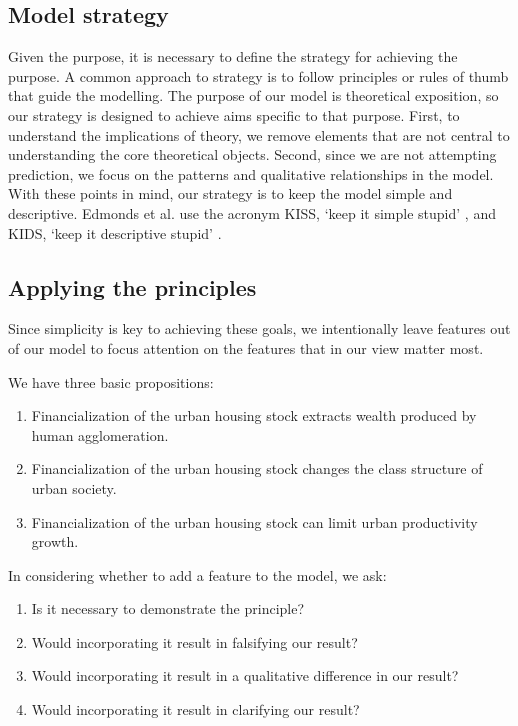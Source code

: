 \subsection{Model strategy}
Given the purpose, it is necessary to define the strategy for achieving the purpose. 
A common approach to strategy is to follow principles or rules of thumb that guide the modelling. %
The purpose of our model is theoretical exposition, so our strategy is designed to achieve aims specific to that purpose. First, to understand the implications of theory, we remove elements that are not central to understanding the core theoretical objects. Second, since we are not attempting prediction, we focus on the patterns and qualitative relationships in the model. With these points in mind, our strategy is to keep the model simple and descriptive. Edmonds et al. use the acronym KISS, `keep it simple stupid' \cite{edmondsDifferentModellingPurposes2019}, and KIDS, `keep it descriptive stupid' \cite{edmondsDifferentModellingPurposes2019}. %


\subsection{Applying the principles}
Since simplicity is key to achieving these goals, %
we intentionally leave features out of our model to focus attention on the features that in our view matter most. 


We have three basic propositions:
\begin{enumerate}
    \item Financialization of the urban housing stock extracts wealth produced by human agglomeration. 
    \item Financialization of the urban housing stock changes the class structure of urban society. 
    \item Financialization of the urban housing stock can limit urban productivity growth. 
\end{enumerate}
In considering whether to add a feature to the model, we ask: %
\begin{enumerate}
    \item Is it necessary to demonstrate the principle? 
    \item Would incorporating it result in falsifying our result?
    \item Would incorporating it result in a qualitative difference in our result?
    \item Would incorporating it result in clarifying our result?
\end{enumerate}

